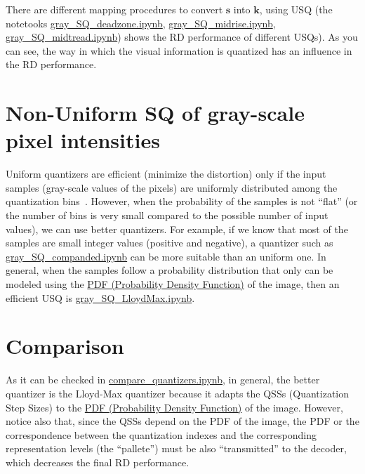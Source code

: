 There are different mapping procedures to convert $\mathbf{s}$ into
$\mathbf{k}$, using USQ (the notetooks
\href{https://github.com/Sistemas-Multimedia/Sistemas-Multimedia.github.io/blob/master/contents/gray_SQ/gray_SQ_deadzone.ipynb}{gray\_SQ\_deadzone.ipynb},
\href{https://github.com/Sistemas-Multimedia/Sistemas-Multimedia.github.io/blob/master/contents/gray_SQ/gray_SQ_midrise.ipynb}{gray\_SQ\_midrise.ipynb},
\href{https://github.com/Sistemas-Multimedia/Sistemas-Multimedia.github.io/blob/master/contents/gray_SQ/gray_SQ_midtread.ipynb}{gray\_SQ\_midtread.ipynb})
shows the RD performance of different USQs). As you can see, the way
in which the visual information is quantized has an influence in the
RD performance.

\section{Non-Uniform SQ of gray-scale pixel intensities}
Uniform quantizers are efficient (minimize the distortion) only if the
input samples (gray-scale values of the pixels) are uniformly
distributed among the quantization
bins~\cite{vruiz__scalar_quantization}. However, when the probability
of the samples is not ``flat'' (or the number of bins is very small
compared to the possible number of input values), we can use better
quantizers. For example, if we know that most of the samples are small
integer values (positive and negative), a quantizer such as
\href{https://github.com/Sistemas-Multimedia/Sistemas-Multimedia.github.io/blob/master/contents/gray_SQ/gray_SQ_companded.ipynb}{gray\_SQ\_companded.ipynb}
can be more suitable than an uniform one. In general, when the samples
follow a probability distribution that only can be modeled using the
\href{https://en.wikipedia.org/wiki/Probability_density_function}{PDF
  (Probability Density Function)} of the image, then an efficient USQ
is
\href{https://github.com/Sistemas-Multimedia/Sistemas-Multimedia.github.io/blob/master/contents/gray_SQ/gray_SQ_LloydMax.ipynb}{gray\_SQ\_LloydMax.ipynb}.

\section{Comparison}

As it can be checked in \href{https://github.com/Sistemas-Multimedia/Sistemas-Multimedia.github.io/blob/master/contents/gray_SQ/compare_quantizers.ipynb}{compare\_quantizers.ipynb}, in general, the better
quantizer is the Lloyd-Max quantizer because it adapts the QSSs
(Quantization Step Sizes) to the
\href{https://en.wikipedia.org/wiki/Probability_density_function}{PDF
  (Probability Density Function)} of the image. However, notice also
that, since the QSSs depend on the PDF of the image, the PDF or the
correspondence between the quantization indexes and the corresponding
representation levels (the ``pallete'') must be also ``transmitted''
to the decoder, which decreases the final RD performance.

